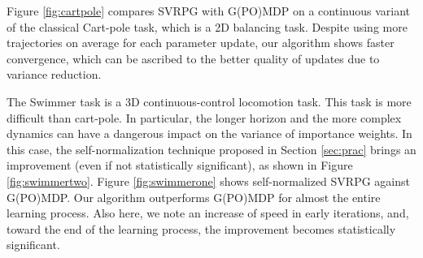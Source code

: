 \documentclass{article}
\theoremstyle{remark}
\theoremstyle{definition}
\begin{document}
%

Figure \ref{fig:cartpole} compares SVRPG with G(PO)MDP on a continuous variant of the classical Cart-pole task, which is a 2D balancing task. Despite using more trajectories on average for each parameter update, our algorithm shows faster convergence, which can be ascribed to the better quality of updates due to variance reduction.

The Swimmer task is a 3D continuous-control locomotion task. This task is more difficult than cart-pole. In particular, the longer horizon and the more complex dynamics can have a dangerous impact on the variance of importance weights. In this case, the self-normalization technique proposed in Section \ref{sec:prac} brings an improvement (even if not statistically significant), as shown in Figure \ref{fig:swimmertwo}. 
Figure \ref{fig:swimmerone} shows self-normalized SVRPG against G(PO)MDP. Our algorithm outperforms G(PO)MDP for almost the entire learning process. Also here, we note an increase of speed in early iterations, and, toward the end of the learning process, the improvement becomes statistically significant.
\end{document}
